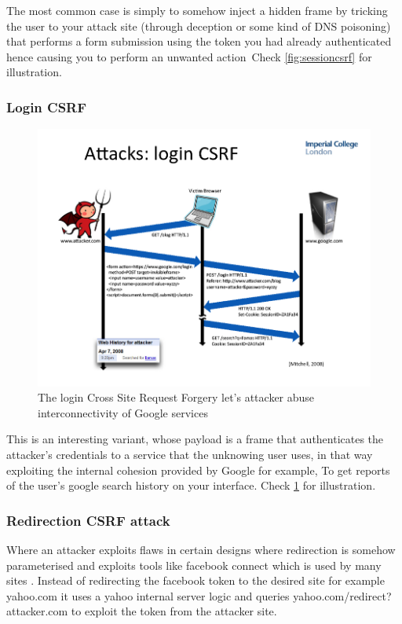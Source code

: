 The most common case is simply to somehow inject a hidden frame by tricking the user to your attack site (through deception or some kind of DNS poisoning)
that performs a form submission using the token you had already authenticated hence causing you to perform an unwanted action\ Check \ref{fig:sessioncsrf}
for illustration.

\subsubsection{Login CSRF}

\begin{figure}
\centering
\includegraphics[width=1\textwidth]{./logincsrf.png}
\caption{\label{fig:logincsrf}The login Cross Site Request Forgery let's attacker abuse interconnectivity of Google services}
\end{figure}

This is an interesting variant, whose payload is a frame that authenticates the attacker's credentials to a service that the unknowing user uses, in that way exploiting
the internal cohesion provided by Google for example, To get reports of the user's google search history on your interface. Check \ref{fig:logincsrf}
for illustration.

\subsubsection{Redirection CSRF attack}


Where an attacker exploits flaws in certain designs where redirection is somehow parameterised and exploits tools like facebook connect which is used by many sites .
Instead of redirecting the facebook token to the desired site for example yahoo.com it uses a yahoo internal server logic and queries yahoo.com/redirect?attacker.com to exploit
the token from the attacker site.



